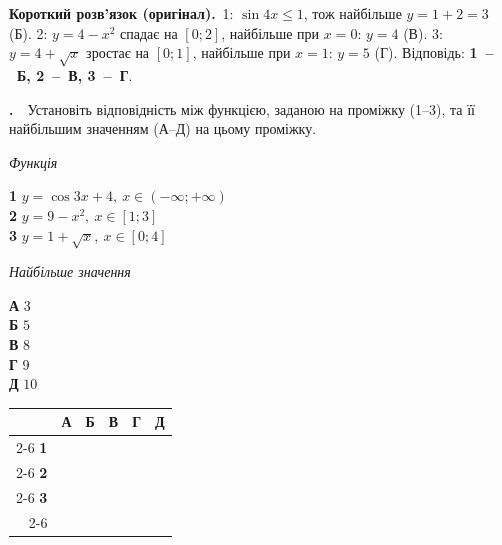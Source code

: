 \documentclass[12pt]{article}
\newcommand{\matchingGrid}{%
    \begingroup
    \renewcommand{\arraystretch}{1.15}
    \setlength{\tabcolsep}{4pt}
    \footnotesize
    \begin{tabular}{r|c|c|c|c|c|}
         \multicolumn{1}{c}{} & \multicolumn{1}{c}{\textbf{А}} & \multicolumn{1}{c}{\textbf{Б}} & \multicolumn{1}{c}{\textbf{В}} & \multicolumn{1}{c}{\textbf{Г}} & \multicolumn{1}{c}{\textbf{Д}} \\ \cline{2-6}
         \textbf{1} & \phantom{X} & \phantom{X} & \phantom{X} & \phantom{X} & \phantom{X} \\ \cline{2-6}
         \textbf{2} & & & & & \\ \cline{2-6}
         \textbf{3} & & & & & \\ \cline{2-6}
    \end{tabular}
    \endgroup
}
\newcounter{zad}
\newcommand{\zadtask}[1]{\stepcounter{zad}\noindent\textbf{\thezad.}\ \ #1\par\vspace{0.2cm}}
\newcommand{\solution}[1]{%
\par\vspace{0.12cm}
\begin{tcolorbox}[colback=titleBg!45, colframe=mainGreen!55, boxrule=0.4pt, arc=2pt,
    left=6pt, right=6pt, top=3pt, bottom=3pt, breakable]
\footnotesize\textbf{Короткий розв'язок (оригінал).}\ #1
\end{tcolorbox}
\par\vspace{0.12cm}
}
\begin{document}
\solution{1: $\sin4x\leqslant1$, тож найбільше $y=1+2=3$ (Б). 2: $y=4-x^2$ спадає на $[0;2]$, найбільше при $x=0$: $y=4$ (В). 3: $y=4+\sqrt{x}$ зростає на $[0;1]$, найбільше при $x=1$: $y=5$ (Г). Відповідь: \textbf{1~--~Б, 2~--~В, 3~--~Г}.}
\zadtask{Установіть відповідність між функцією, заданою на проміжку (1--3), та її найбільшим значенням (А--Д) на цьому проміжку.

\vspace{0.3cm}
\noindent
\begin{minipage}[t]{0.48\textwidth}
\textit{Функція}\par\vspace{0.2cm}
\textbf{1} \quad $y = \cos 3x + 4,\ x \in (-\infty; +\infty)$\\[0.35cm]
\textbf{2} \quad $y = 9 - x^2,\ x \in [1; 3]$\\[0.35cm]
\textbf{3} \quad $y = 1 + \sqrt{x},\ x \in [0; 4]$
\end{minipage}
\hfill
\begin{minipage}[t]{0.32\textwidth}
\textit{Найбільше значення}\par\vspace{0.2cm}
\textbf{А} \quad $3$\\[0.15cm]
\textbf{Б} \quad $5$\\[0.15cm]
\textbf{В} \quad $8$\\[0.15cm]
\textbf{Г} \quad $9$\\[0.15cm]
\textbf{Д} \quad $10$
\end{minipage}
\hfill
\begin{minipage}[t]{0.16\textwidth}
\vspace{0.4cm}
\begin{flushright}\matchingGrid\end{flushright}
\end{minipage}
}
\end{document}
